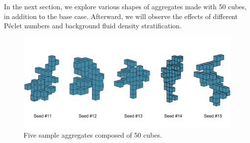 \par
In the next section, we explore various shapes of aggregates made with 50 cubes, in addition to the base case. Afterward, we will observe the effects of different Péclet numbers and background fluid density stratification. 
\begin{figure}[ht]
	\begin{center}
		\includegraphics[scale=0.42]{./figures/fig_seed11_15_all.pdf}
	\caption{Five sample aggregates composed of 50 cubes.}
	\label{fig_seed11_15_all}
\end{center}
\end{figure}
\par
